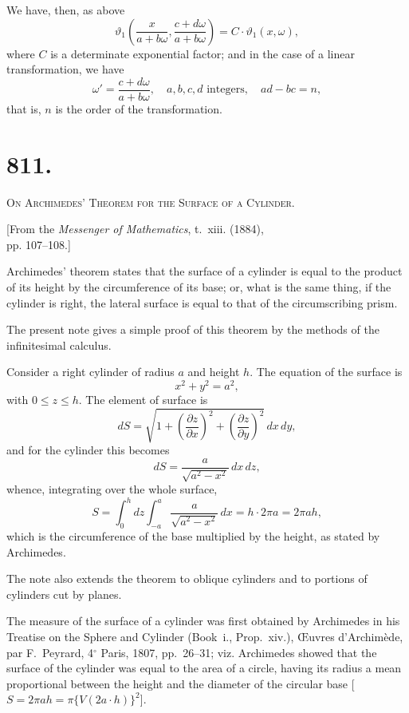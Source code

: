 \documentclass[11pt,a4paper]{book}
\begin{document}
We have, then, as above
\[
\vartheta_1\left(\frac{x}{a+b\omega}, \frac{c+d\omega}{a+b\omega}\right) = C \cdot \vartheta_1(x, \omega),
\]
where $C$ is a determinate exponential factor; and in the case of a linear transformation, we have
\[
\omega' = \frac{c + d\omega}{a + b\omega}, \quad a, b, c, d \text{ integers}, \quad ad - bc = n,
\]
that is, $n$ is the order of the transformation.



\newpage
\section*{811.}
\begin{center}
{\large\scshape On Archimedes' Theorem for the Surface of a Cylinder.}
\end{center}

\begin{flushright}
\small[From the \textit{Messenger of Mathematics}, t.~xiii. (1884),\\
pp. 107--108.]
\end{flushright}

Archimedes' theorem states that the surface of a cylinder is equal to the product of its height by the circumference of its base; or, what is the same thing, if the cylinder is right, the lateral surface is equal to that of the circumscribing prism.

The present note gives a simple proof of this theorem by the methods of the infinitesimal calculus.

Consider a right cylinder of radius $a$ and height $h$. The equation of the surface is
\[
x^2 + y^2 = a^2,
\]
with $0 \leq z \leq h$. The element of surface is
\[
dS = \sqrt{1 + \left(\frac{\partial z}{\partial x}\right)^2 + \left(\frac{\partial z}{\partial y}\right)^2} \, dx \, dy,
\]
and for the cylinder this becomes
\[
dS = \frac{a}{\sqrt{a^2 - x^2}} \, dx \, dz,
\]
whence, integrating over the whole surface,
\[
S = \int_0^h dz \int_{-a}^{a} \frac{a}{\sqrt{a^2 - x^2}} \, dx = h \cdot 2\pi a = 2\pi a h,
\]
which is the circumference of the base multiplied by the height, as stated by Archimedes.

The note also extends the theorem to oblique cylinders and to portions of cylinders cut by planes.

The measure of the surface of a cylinder was first obtained by Archimedes in his Treatise on the Sphere and Cylinder (Book~i., Prop.~xiv.), \OE uvres d'Archim\`ede, par F.~Peyrard, 4$^{\circ}$ Paris, 1807, pp.~26--31; viz. Archimedes showed that the surface of the cylinder was equal to the area of a circle, having its radius a mean proportional between the height and the diameter of the circular base [$S = 2\pi ah = \pi \{V(2a \cdot h)\}^2$].
\end{document}
